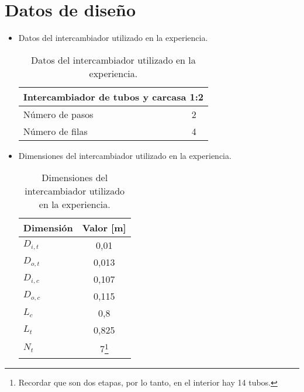 \documentclass[twoside,twocolumn,letter,10pt]{article}
\begin{document}
\section{Datos de diseño}
\begin{itemize}
\item{Datos del intercambiador utilizado en la experiencia.}

\begin{table}[htbp]
  \centering
  \caption{Datos del intercambiador utilizado en la experiencia.}
    \begin{tabular}{p{5.355em}c}
    \toprule
    \multicolumn{2}{p{10.71em}}{Intercambiador de tubos y carcasa 1:2} \\
    \midrule
    \midrule
    Número de pasos & 2 \\
    Número de filas & 4 \\
    \end{tabular}%
  \label{tab:addlabel}%
\end{table}%

\item{Dimensiones del intercambiador utilizado en la experiencia.}
\begin{table}[htbp]
  \centering
  \caption{Dimensiones del intercambiador utilizado en la experiencia.}
    \begin{tabular}{lc}
    \toprule
    \multicolumn{1}{c}{Dimensión} & \multicolumn{1}{p{5.355em}}{Valor [m]} \\
    \midrule
    \midrule
    $D_{i,t}$     & 0,01 \\
    $D_{o,t}$     & 0,013 \\
    $D_{i,c}$     & 0,107 \\
    $D_{o,c}$     & 0,115 \\
    $L_c$     & 0,8 \\
    $L_t$     & 0,825 \\
    $N_t$     & 7\footnote{Recordar que son dos etapas, por lo tanto, en el interior hay 14 tubos.} \\
    \end{tabular}%
  \label{tab:addlabel}%
\end{table}%


\end{itemize}

\newpage
\end{document}
